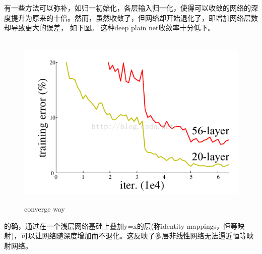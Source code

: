 \documentclass[12pt]{ctexart}%
\begin{document}
\begin{itemize}
			有一些方法可以弥补，如归一初始化，各层输入归一化，使得可以收敛的网络的深度提升为原来的十倍。然而，虽然收敛了，但网络却开始退化了，即增加网络层数却导致更大的误差， 如下图。 这种deep plain net收敛率十分低下。
				\begin{figure}[H]
					\vspace{-0.2cm}  %
					\setlength{\abovecaptionskip}{-0.2cm}   %
					\centering
					\includegraphics[scale=0.5]{converge_way.png}
					\renewcommand{\figurename}{Fig} %
					\caption{converge way}
					\label{fig19:converge way}
				\end{figure}
			的确，通过在一个浅层网络基础上叠加y=x的层(称identity mappings，恒等映射)，可以让网络随深度增加而不退化。这反映了多层非线性网络无法逼近恒等映射网络。
			

\end{itemize}
\end{document}
